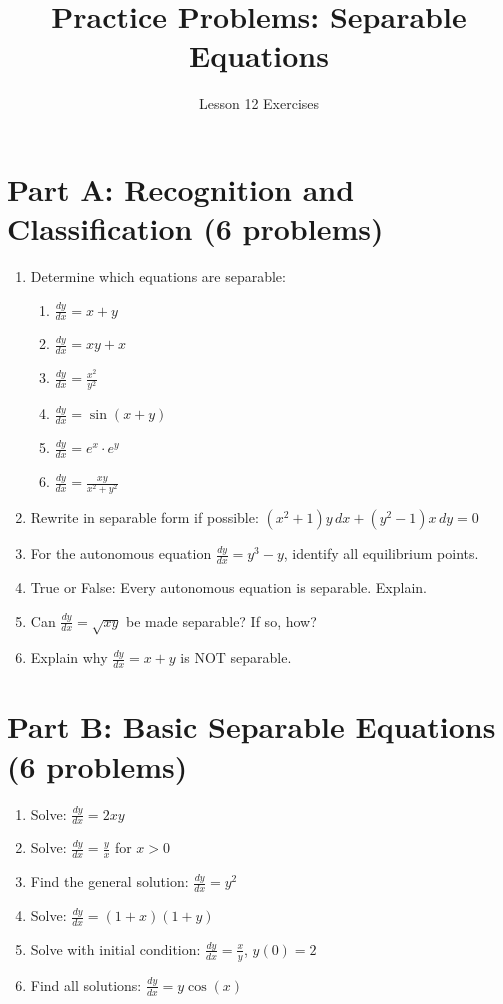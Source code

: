 \documentclass[12pt]{article}
\title{Practice Problems: Separable Equations}
\author{Lesson 12 Exercises}
\begin{document}
\maketitle

\section*{Part A: Recognition and Classification (6 problems)}

\begin{enumerate}
\item Determine which equations are separable:
    \begin{enumerate}
        \item $\frac{dy}{dx} = x + y$
        \item $\frac{dy}{dx} = xy + x$
        \item $\frac{dy}{dx} = \frac{x^2}{y^2}$
        \item $\frac{dy}{dx} = \sin(x+y)$
        \item $\frac{dy}{dx} = e^x \cdot e^y$
        \item $\frac{dy}{dx} = \frac{xy}{x^2 + y^2}$
    \end{enumerate}

\item Rewrite in separable form if possible: $(x^2 + 1)y\,dx + (y^2 - 1)x\,dy = 0$

\item For the autonomous equation $\frac{dy}{dx} = y^3 - y$, identify all equilibrium points.

\item True or False: Every autonomous equation is separable. Explain.

\item Can $\frac{dy}{dx} = \sqrt{xy}$ be made separable? If so, how?

\item Explain why $\frac{dy}{dx} = x + y$ is NOT separable.
\end{enumerate}

\section*{Part B: Basic Separable Equations (6 problems)}

\begin{enumerate}[resume]
\item Solve: $\frac{dy}{dx} = 2xy$

\item Solve: $\frac{dy}{dx} = \frac{y}{x}$ for $x > 0$

\item Find the general solution: $\frac{dy}{dx} = y^2$

\item Solve: $\frac{dy}{dx} = (1+x)(1+y)$

\item Solve with initial condition: $\frac{dy}{dx} = \frac{x}{y}$, $y(0) = 2$

\item Find all solutions: $\frac{dy}{dx} = y\cos(x)$
\end{enumerate}
\end{document}
